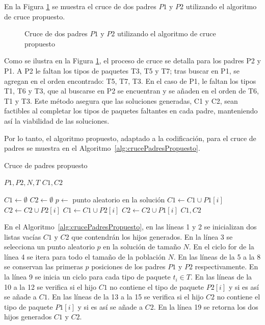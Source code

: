 En la Figura \ref{fig:cruce_propuesto} se muestra el cruce de dos padres $P1$ y $P2$ utilizando el algoritmo de cruce propuesto.

\begin{figure}[H]
    \centering
    
    \caption{Cruce de dos padres $P1$ y $P2$ utilizando el algoritmo de cruce propuesto}
    \label{fig:cruce_propuesto}
\end{figure}

Como se ilustra en la Figura \ref{fig:cruce_propuesto}, el proceso de cruce se detalla para los padres P2 y P1. A P2 le faltan los tipos de paquetes T3, T5 y T7; tras buscar en P1, se agregan en el orden encontrado: T5, T7, T3. En el caso de P1, le faltan los tipos T1, T6 y T3, que al buscarse en P2 se encuentran y se añaden en el orden de T6, T1 y T3. Este método asegura que las soluciones generadas, C1 y C2, sean factibles al completar los tipos de paquetes faltantes en cada padre, manteniendo así la viabilidad de las soluciones.

Por lo tanto, el algoritmo propuesto, adaptado a la codificación, para el cruce de padres se muestra en el Algoritmo~\ref{alg:crucePadresPropuesto}.

\begin{algorithm}[H]
    \caption{Cruce de padres propuesto}\label{alg:crucePadresPropuesto}
    \begin{algorithmic}[1]
        \Require $P1, P2, N, T$
        \Ensure $C1, C2$

        \State $C1 \leftarrow \emptyset$
        \State $C2 \leftarrow \emptyset$
        \State $p \leftarrow$ punto aleatorio en la solución
        \State $C1 \leftarrow C1 \cup P1[i]$
        \State $C2 \leftarrow C2 \cup P2[i]$
        \Else
        \State $C1 \leftarrow C1 \cup P2[i]$
        \EndIf
        \State $C2 \leftarrow C2 \cup P1[i]$
        \EndIf
        \EndFor
        \EndIf
        \EndFor
        \State \Return $C1, C2$
    \end{algorithmic}
\end{algorithm}

En el Algoritmo~\ref{alg:crucePadresPropuesto}, en las líneas 1 y 2 se inicializan dos listas vacías $C1$ y $C2$ que contendrán los hijos generados. En la línea 3 se selecciona un punto aleatorio $p$ en la solución de tamaño $N$. En el ciclo for de la línea 4 se itera para todo el tamaño de la población $N$. En las líneas de la 5 a la 8 se conservan las primeras $p$ posiciones de los padres $P1$ y $P2$ respectivamente. En la línea 9 se inicia un ciclo para cada tipo de paquete $t_i \in T$. En las líneas de la 10 a la 12 se verifica si el hijo $C1$ no contiene el tipo de paquete $P2[i]$ y si es así se añade a $C1$. En las líneas de la 13 a la 15 se verifica si el hijo $C2$ no contiene el tipo de paquete $P1[i]$ y si es así se añade a $C2$. En la línea 19 se retorna los dos hijos generados $C1$ y $C2$.

